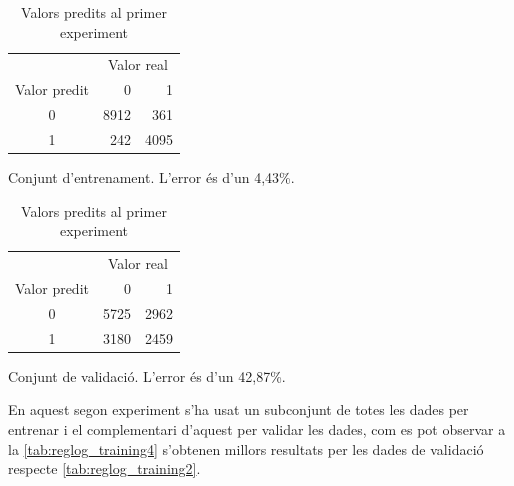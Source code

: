 \documentclass[a4paper]{article}
\begin{document}
\begin{table}[H]
	\def\arraystretch{1.3}
	\begin{subtable}[t]{0.49\textwidth}
		\centering
		\begin{tabular}{|c|rr|}
			\hline
			& \multicolumn{2}{c|}{Valor real} \\
			Valor predit & 0 & 1 \\
			\hline
			0 & 8912 & 361 \\
			1 & 242 & 4095 \\
			\hline
		\end{tabular}
		\caption{Conjunt d'entrenament. L'error és d'un 4,43\%.}
		\label{tab:reglog_training1}
	\end{subtable}
	\begin{subtable}[t]{0.49\textwidth}
		\centering
		\begin{tabular}{|c|rr|}
			\hline
			& \multicolumn{2}{c|}{Valor real} \\
			Valor predit & 0 & 1 \\
			\hline
			0 & 5725 & 2962 \\
			1 & 3180 & 2459 \\
			\hline
		\end{tabular}
		\caption{Conjunt de validació. L'error és d'un 42,87\%.}
		\label{tab:reglog_training2}
	\end{subtable}
	\caption{Valors predits al primer experiment}
\end{table}

En aquest segon experiment s'ha usat un subconjunt de totes les dades per entrenar i el complementari d'aquest per validar les dades, com es pot observar a la \autoref{tab:reglog_training4} s'obtenen millors resultats per les dades de validació respecte \autoref{tab:reglog_training2}.
\end{document}
